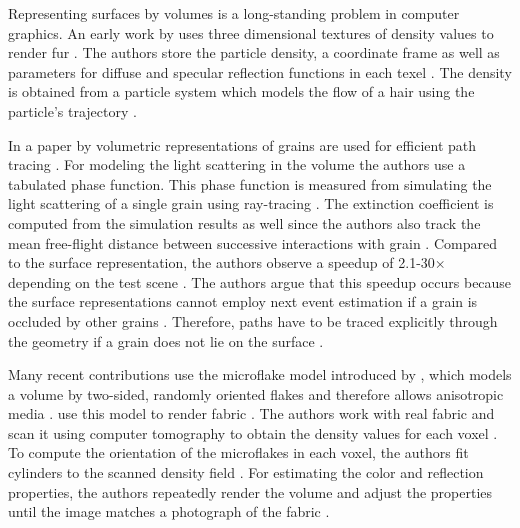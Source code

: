 Representing surfaces by volumes is a long-standing problem in computer graphics.
An early work by \citeauthor{kajiya_rendering_fur_with_textures} uses three dimensional textures of density values to render fur \cite{kajiya_rendering_fur_with_textures}.
The authors store the particle density, a coordinate frame as well as parameters for diffuse and specular reflection functions in each texel \cite{kajiya_rendering_fur_with_textures}.
The density is obtained from a particle system which models the flow of a hair using the particle's trajectory \cite{kajiya_rendering_fur_with_textures}.

In a paper by \citeauthor{meng_multi_scale_modeling_and_rendering_of_granular_materials} volumetric representations of grains are used for efficient path tracing \cite{meng_multi_scale_modeling_and_rendering_of_granular_materials}.
For modeling the light scattering in the volume the authors use a tabulated phase function.
This phase function is measured from simulating the light scattering of a single grain using ray-tracing \cite{meng_multi_scale_modeling_and_rendering_of_granular_materials}.
The extinction coefficient is computed from the simulation results as well since the authors also track the mean free-flight distance between successive interactions with grain \cite{meng_multi_scale_modeling_and_rendering_of_granular_materials}.
Compared to the surface representation, the authors observe a speedup of 2.1-30$\times$ depending on the test scene \cite{meng_multi_scale_modeling_and_rendering_of_granular_materials}.
The authors argue that this speedup occurs because the surface representations cannot employ next event estimation if a grain is occluded by other grains \cite{meng_multi_scale_modeling_and_rendering_of_granular_materials}.
Therefore, paths have to be traced explicitly through the geometry if a grain does not lie on the surface \cite{meng_multi_scale_modeling_and_rendering_of_granular_materials}.

Many recent contributions use the microflake model introduced by \citeauthor{microflake}, which models a volume by two-sided, randomly oriented flakes and therefore allows anisotropic media \cite{microflake}.
\citeauthor{zhao_building_volumetric_appearance_models} use this model to render fabric \cite{zhao_building_volumetric_appearance_models}.
The authors work with real fabric and scan it using computer tomography to obtain the density values for each voxel \cite{zhao_building_volumetric_appearance_models}.
To compute the orientation of the microflakes in each voxel, the authors fit cylinders to the scanned density field \cite{zhao_building_volumetric_appearance_models}.
For estimating the color and reflection properties, the authors repeatedly render the volume and adjust the properties until the image matches a photograph of the fabric \cite{zhao_building_volumetric_appearance_models}.

